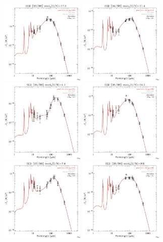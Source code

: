 \documentclass[preprint2,longabstract]{aastex}
\begin{document}
\begin{figure}
    \includegraphics[trim=0 2mm 0 0, clip, width=40mm]{../SEDs/sed_33.pdf}
	\includegraphics[trim=0 2mm 0 0, clip, width=40mm]{../SEDs/sed_34.pdf}
	\includegraphics[trim=0 2mm 0 0, clip, width=40mm]{../SEDs/sed_35.pdf}
	\includegraphics[trim=0 2mm 0 0, clip, width=40mm]{../SEDs/sed_36.pdf}
	\includegraphics[trim=0 2mm 0 0, clip, width=40mm]{../SEDs/sed_37.pdf}
	\includegraphics[trim=0 2mm 0 0, clip, width=40mm]{../SEDs/sed_38.pdf}

\end{figure}
\end{document}
